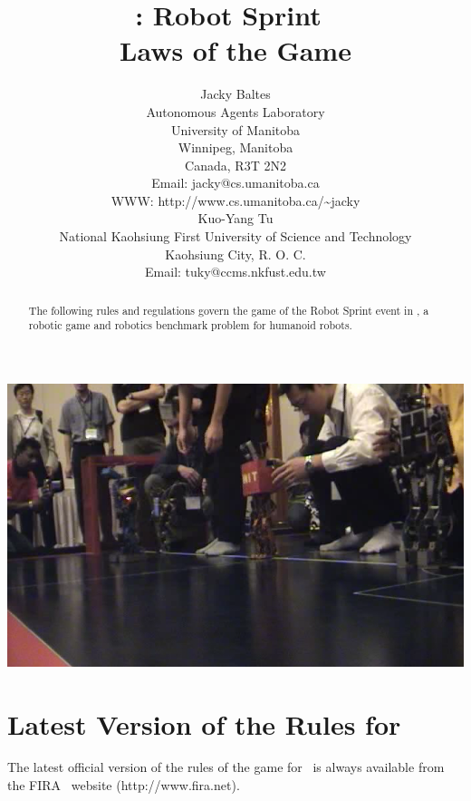 \documentclass[12pt]{hurocup}
\begin{document}
\title{\HuroCup: Robot Sprint\ \\
  Laws of the Game \thisyear}

\author{Jacky Baltes\\
Autonomous Agents Laboratory\\
University of Manitoba\\
Winnipeg, Manitoba\\
Canada, R3T 2N2\\
Email: jacky@cs.umanitoba.ca\\
WWW: http://www.cs.umanitoba.ca/\~{ }jacky\\[5mm]
Kuo-Yang Tu\\
National Kaohsiung First University of Science and Technology\\
Kaohsiung City, R. O. C.\\
Email: tuky@ccms.nkfust.edu.tw\\
}

\maketitle

\begin{center}
 \includegraphics[width=0.7\linewidth]{Figures/sprint-life}
\end{center}

\begin{abstract}
The following rules and regulations govern the game of the Robot Sprint
event in \HuroCup, a robotic game and robotics benchmark problem for
humanoid robots.
%
\end{abstract}

\section*{Latest Version of the Rules for \HuroCup}
\label{sec:updates}

The latest official version of the rules of the game for \HuroCup\ is
always available from the FIRA \HuroCup\ website (http://www.fira.net).
\end{document}
